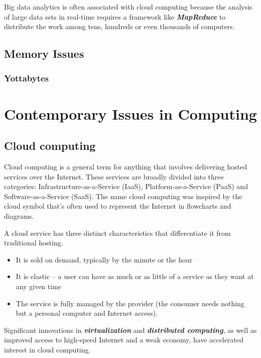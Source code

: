 \documentclass[12pt, a4paper]{report}
\theoremstyle{plain}
\theoremstyle{definition}
\theoremstyle{remark}
\begin{document}
Big data analytics is often associated with cloud computing because the analysis of large data sets in real-time requires a framework like \textbf{\emph{MapReduce}} to distribute the work among tens, hundreds or even thousands of computers.

\section{Memory Issues}
\subsection{Yottabytes}







\chapter{Contemporary Issues in Computing}
\section{Cloud computing}
Cloud computing is a general term for anything that involves delivering hosted services over the Internet. These services are broadly divided into three categories: Infrastructure-as-a-Service (IaaS), Platform-as-a-Service (PaaS) and Software-as-a-Service (SaaS). The name cloud computing was inspired by the cloud symbol that's often used to represent the Internet in flowcharts and diagrams.


A cloud service has three distinct characteristics that differentiate it from traditional hosting.
\begin{itemize} 
\item It is sold on demand, typically by the minute or the hour 
\item It is elastic -- a user can have as much or as little of a service as they want at any given time
\item The service is fully managed by the provider (the consumer needs nothing but a personal computer and Internet access). 
\end{itemize}

Significant innovations in \textbf{\emph{virtualization}} and \textbf{\emph{distributed computing}}, as well as improved access to high-speed Internet and a weak economy, have accelerated interest in cloud computing.
\end{document}
